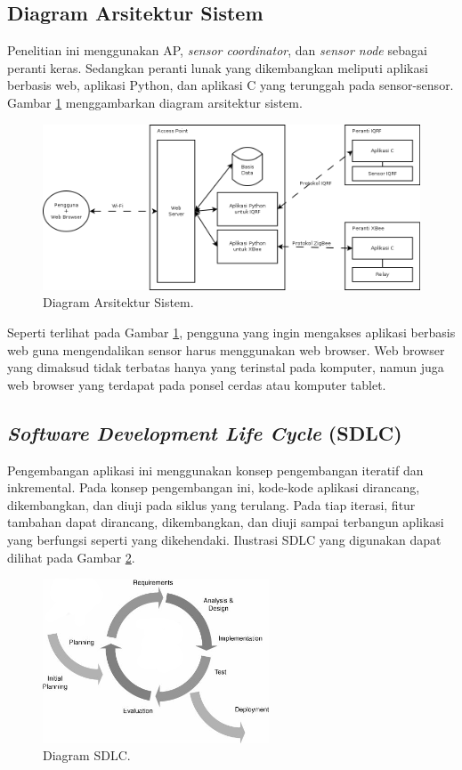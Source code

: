 		\subsection{Diagram Arsitektur Sistem}
			Penelitian ini menggunakan AP, \emph{sensor coordinator}, dan \emph{sensor node} sebagai peranti keras. Sedangkan peranti lunak yang dikembangkan meliputi aplikasi berbasis web, aplikasi Python, dan aplikasi C yang terunggah pada sensor-sensor. Gambar \ref{system-architecture} menggambarkan diagram arsitektur sistem.
			
			\begin{figure}[H]
			  \centering
			    \includegraphics[width=\textwidth]{gambar/system-architecture}
			    \caption{Diagram Arsitektur Sistem.}
			    \label{system-architecture}
			\end{figure}

			Seperti terlihat pada Gambar \ref{system-architecture}, pengguna yang ingin mengakses aplikasi berbasis web guna mengendalikan sensor harus menggunakan web browser. Web browser yang dimaksud tidak terbatas hanya yang terinstal pada komputer, namun juga web browser yang terdapat pada ponsel cerdas atau komputer tablet.

		\subsection{\emph{Software Development Life Cycle} (SDLC)}
			Pengembangan aplikasi ini menggunakan konsep pengembangan iteratif dan inkremental. Pada konsep pengembangan ini, kode-kode aplikasi dirancang, dikembangkan, dan diuji pada siklus yang terulang. Pada tiap iterasi, fitur tambahan dapat dirancang, dikembangkan, dan diuji sampai terbangun aplikasi yang berfungsi seperti yang dikehendaki. Ilustrasi SDLC yang digunakan dapat dilihat pada Gambar \ref{sdlc}.

			\begin{figure}[H]
			  \centering
			    \includegraphics[width=0.6\textwidth]{gambar/sdlc}
			    \caption{Diagram SDLC.}
			    \label{sdlc}
			\end{figure}

